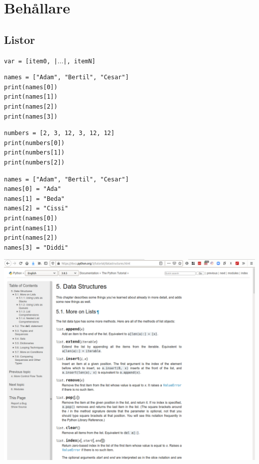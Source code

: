 \mode*

\section{Behållare}

\subsection{Listor}

\begin{frame}[fragile]
  \texttt{var = [item0, |$\dotsc$|, itemN]}
\end{frame}

\begin{frame}[fragile]
  \begin{example}
    \begin{verbatim}
names = ["Adam", "Bertil", "Cesar"]
print(names[0])
print(names[1])
print(names[2])
print(names[3])
    \end{verbatim}
  \end{example}

  \pause

  \begin{example}
    \begin{verbatim}
numbers = [2, 3, 12, 3, 12, 12]
print(numbers[0])
print(numbers[1])
print(numbers[2])
    \end{verbatim}
  \end{example}
\end{frame}

\begin{frame}[fragile]
  \begin{example}
    \begin{verbatim}
names = ["Adam", "Bertil", "Cesar"]
names[0] = "Ada"
names[1] = "Beda"
names[2] = "Cissi"
print(names[0])
print(names[1])
print(names[2])
names[3] = "Diddi"
    \end{verbatim}
  \end{example}
\end{frame}

\begin{frame}
  \includegraphics[width=\columnwidth]{figs/docs-lists.png}
\end{frame}

